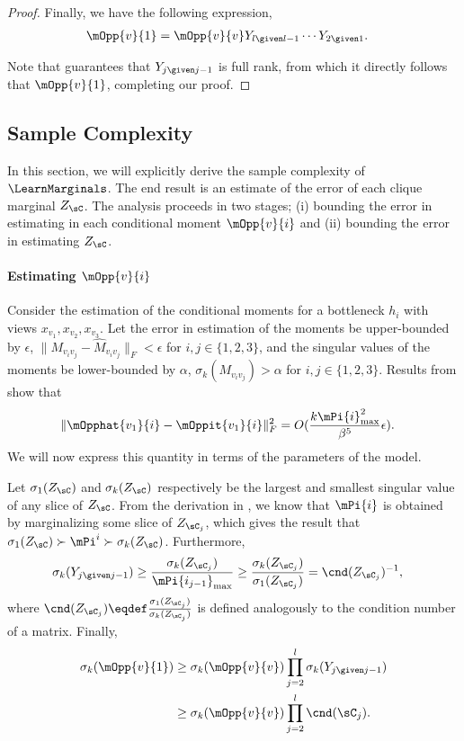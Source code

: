 \begin{proof}
Finally, we have the following expression,
\begin{align*}
  \mOpp{v}{1} &= \mOpp{v}{v} Y_{l \given l-1} \cdots Y_{2 \given 1}.
\end{align*}

Note that  guarantees that $Y_{j \given
  j -1}$ is full rank, from which it directly follows that $\mOpp{v}{1}$, completing our proof.
\end{proof}

\subsection{Sample Complexity}

In this section, we will explicitly derive the sample complexity of
  $\LearnMarginals$. The end result is an estimate of the error of
  each clique marginal $Z_\sC$.
The analysis proceeds in two stages; (i) bounding the error in
  estimating in each conditional moment $\mOpp{v}{i}$ and (ii) bounding
  the error in estimating $Z_\sC$.

\paragraph{Estimating $\mOpp{v}{i}$}

Consider the estimation of the conditional moments for a bottleneck
  $h_i$ with views $x_{v_1}, x_{v_2}, x_{v_3}$. 
Let the error in estimation of the moments be upper-bounded by
  $\epsilon$, $\|M_{v_i v_j} - \hat M_{v_i v_j} \|_F < \epsilon$ for $i,
  j \in \{1,2,3\}$, and 
the singular values of the moments be lower-bounded by $\alpha$,
  $\sigma_k(M_{v_i v_j}) > \alpha$ for $i, j \in \{1,2,3\}$.
Results from \citet{anandkumar12moments,anandkumar13tensor} show that 
\begin{align*}
  \|\mOpphat{v_1}{i} - \mOppit{v_1}{i}\|^2_F 
    &= O( 
    \frac{k {\mPi{i}}_{\max}^2}
    {\beta^5 } \epsilon ). 
\end{align*}
We will now express this quantity in terms of the parameters of the model.

Let $\sigma_1(Z_\sC)$ and $\sigma_k(Z_\sC)$ respectively be the largest
  and smallest singular value of any slice of $Z_\sC$. 
From the derivation in , we know that $\mPi{i}$
  is obtained by marginalizing some slice of $Z_{\sC_j}$, which gives
  the result that $\sigma_1(Z_\sC) \succ \mPi^{i} \succ \sigma_k(Z_\sC)$.
Furthermore, 
\begin{align*}
  \sigma_k(Y_{j \given j-1}) &\ge \frac{\sigma_k(Z_{\sC_j})}{\mPi{i_{j-1}}_{\max}}
                             \ge \frac{\sigma_k(Z_{\sC_j})}{\sigma_1(Z_{\sC_j})}
                             = \cnd(Z_{\sC_j})^{-1},
\end{align*}
where $\cnd(Z_{\sC_j}) \eqdef
\frac{\sigma_1(Z_{\sC_j})}{\sigma_k(Z_{\sC_j})}$ is defined analogously
to the condition number of a matrix. 
Finally,
\begin{align*}
  \sigma_k(\mOpp{v}{1}) 
    &\ge \sigma_k(\mOpp{v}{v}) \prod_{j=2}^{l} \sigma_k(Y_{j \given j-1}) \\
    &\ge \sigma_k(\mOpp{v}{v}) \prod_{j=2}^{l} \cnd(\sC_{j}).
\end{align*}

